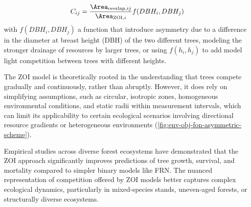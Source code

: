 \begin{align}
    C_{ij} = \frac{ \Area_{\text{overlap}, ij} }{ \Area_{\text{ZOI}, i} } f(DBH_i, DBH_j)
\end{align}
with $f(DBH_i, DBH_j)$ a function that introduce asymmetry due to a difference in the diameter at breast height (DBH) of the two different trees, modeling the stronger drainage of resources by larger trees, or using $f(h_i, h_j)$ to add model light competition between trees with different heights.
    

The ZOI model is theoretically rooted in the understanding that trees compete gradually and continuously, rather than abruptly. However, it does rely on simplifying assumptions, such as circular, isotropic zones, homogeneous environmental conditions, and static radii within measurement intervals, which can limit its applicability to certain ecological scenarios involving directional resource gradients or heterogeneous environments (\cref{fig:env-obj-fon-asymmetric-scheme}).

Empirical studies across diverse forest ecosystems have demonstrated that the ZOI approach significantly improves predictions of tree growth, survival, and mortality compared to simpler binary models like FRN. The nuanced representation of competition offered by ZOI models better captures complex ecological dynamics, particularly in mixed-species stands, uneven-aged forests, or structurally diverse ecosystems.



